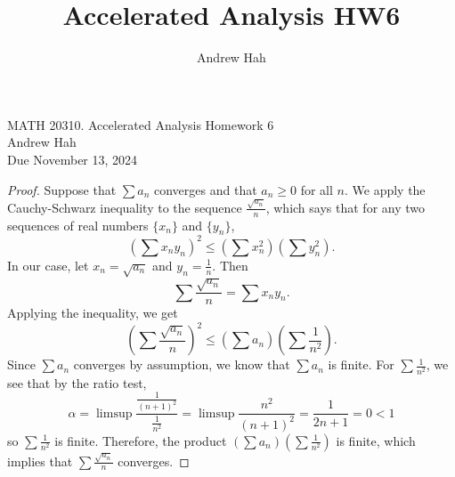 \documentclass[11pt]{article}
\title{Accelerated Analysis HW6}
\author{Andrew Hah}
\begin{document}
\pagestyle{plain}
\begin{center}
{\Large MATH 20310. Accelerated Analysis Homework 6} \\ 
\vspace{.2in}  
Andrew Hah \\
Due November 13, 2024
\end{center}

\begin{exercise}{7}
    \begin{proof} 
        Suppose that \( \sum a_n \) converges and that \( a_n \ge 0 \) for all \( n \). We apply the Cauchy-Schwarz inequality to the sequence \( \frac{\sqrt{a_n}}{n} \), which says that for any two sequences of real numbers \( \{x_n\} \) and \( \{y_n\} \), \[ \left( \sum x_n y_n \right)^2 \le \left( \sum x_n^2 \right) \left( \sum y_n^2 \right). \] In our case, let \( x_n = \sqrt{a_n} \) and \( y_n = \frac{1}{n} \). Then \[ \sum \frac{\sqrt{a_n}}{n} = \sum x_n y_n. \] Applying the inequality, we get \[ \left( \sum \frac{\sqrt{a_n}}{n} \right)^2 \le \left( \sum a_n \right) \left( \sum \frac{1}{n^2} \right). \] Since \( \sum a_n \) converges by assumption, we know that \( \sum a_n \) is finite. For $\sum \frac{1}{n^2}$, we see that by the ratio test, $$\alpha = \limsup \frac{\frac{1}{(n+1)^2}}{\frac{1}{n^2}} = \limsup \frac{n^2}{(n+1)^2} = \frac{1}{2n + 1} = 0 < 1$$ so $\sum \frac{1}{n^2}$ is finite. Therefore, the product \( \left( \sum a_n \right) \left( \sum \frac{1}{n^2} \right) \) is finite, which implies that \( \sum \frac{\sqrt{a_n}}{n} \) converges. 
    \end{proof}
\end{exercise}
\end{document}
